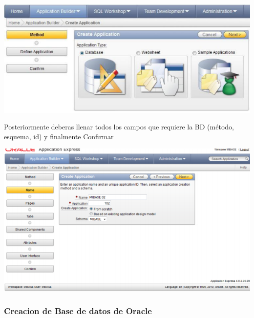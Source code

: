 \documentclass[12pt,letterpaper]{article}
\begin{document}
\begin{center}
\includegraphics[width=15cm]{./IMG/img12}
\end{center}
Posteriormente deberas llenar todos los campos que requiere la BD (método,
esquema, id) y finalmente Confirmar

\begin{center}
\includegraphics[width=15cm]{./IMG/img13}
\end{center}
\subsubsection{Creacion de Base de datos de Oracle}
\end{document}
